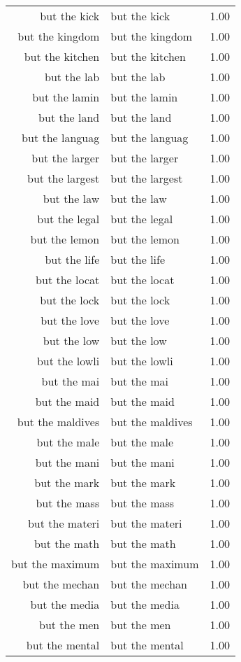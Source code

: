 \begin{table}[ht]
\begin{tabular}{rlr}
  but the kick & but the kick & 1.00 \\ 
  but the kingdom & but the kingdom & 1.00 \\ 
  but the kitchen & but the kitchen & 1.00 \\ 
  but the lab & but the lab & 1.00 \\ 
  but the lamin & but the lamin & 1.00 \\ 
  but the land & but the land & 1.00 \\ 
  but the languag & but the languag & 1.00 \\ 
  but the larger & but the larger & 1.00 \\ 
  but the largest & but the largest & 1.00 \\ 
  but the law & but the law & 1.00 \\ 
  but the legal & but the legal & 1.00 \\ 
  but the lemon & but the lemon & 1.00 \\ 
  but the life & but the life & 1.00 \\ 
  but the locat & but the locat & 1.00 \\ 
  but the lock & but the lock & 1.00 \\ 
  but the love & but the love & 1.00 \\ 
  but the low & but the low & 1.00 \\ 
  but the lowli & but the lowli & 1.00 \\ 
  but the mai & but the mai & 1.00 \\ 
  but the maid & but the maid & 1.00 \\ 
  but the maldives & but the maldives & 1.00 \\ 
  but the male & but the male & 1.00 \\ 
  but the mani & but the mani & 1.00 \\ 
  but the mark & but the mark & 1.00 \\ 
  but the mass & but the mass & 1.00 \\ 
  but the materi & but the materi & 1.00 \\ 
  but the math & but the math & 1.00 \\ 
  but the maximum & but the maximum & 1.00 \\ 
  but the mechan & but the mechan & 1.00 \\ 
  but the media & but the media & 1.00 \\ 
  but the men & but the men & 1.00 \\ 
  but the mental & but the mental & 1.00 \\ 

\end{tabular}
\end{table}
